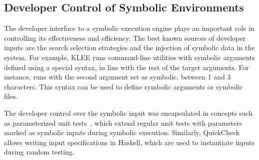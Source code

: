 \subsection{Developer Control of Symbolic Environments}

The developer interface to a symbolic execution engine plays an important role in controlling its effectiveness and efficiency.
%
The best known sources of developer inputs are the search selection strategies and the injection of symbolic data in the system.
%
For example, KLEE runs command-line utilities with symbolic arguments defined using a special syntax, in line with the rest of the target arguments.  For instance,  runs  with the second argument set as symbolic, between 1 and 3 characters.  This syntax can be used to define symbolic arguments or symbolic files.

The developer control over the symbolic input was encapsulated in concepts such as parameterized unit tests~\cite{tillmann-puts}, which extend regular unit tests with parameters marked as symbolic inputs during symbolic execution.
%
Similarly, QuickCheck~\cite{quickcheck} allows writing input specifications in Haskell, which are used to instantiate inputs during random testing.


